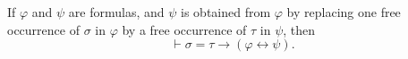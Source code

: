 If $\varphi$ and $\psi$ are formulas, and $\psi$ is obtained from $\varphi$ by replacing one free occurrence of $\sigma$ in $\varphi$ by a free occurrence of $\tau$ in $\psi$, then
$$\vdash \sigma = \tau \rightarrow (\varphi \leftrightarrow \psi).$$
